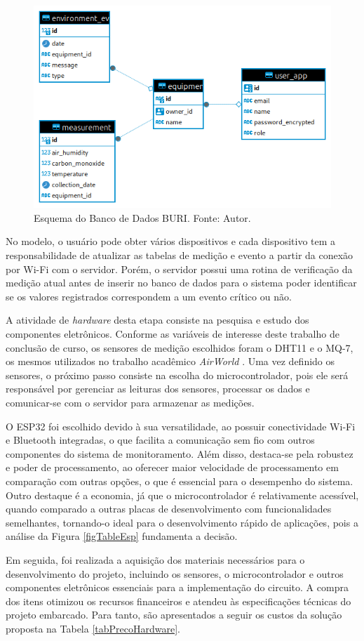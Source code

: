 \begin{figure}[ht]
    \centering
    \includegraphics[width=.54\textwidth]{img/buri_schema_bd.png}
    \caption{Esquema do Banco de Dados BURI. Fonte: Autor.}\label{figSchemaBuriDB}
\end{figure}

No modelo, o usuário pode obter vários dispositivos e cada dispositivo tem a responsabilidade de atualizar as tabelas de medição e evento 
a partir da conexão por Wi-Fi com o servidor. Porém, o servidor possui uma rotina de verificação da medição atual antes de inserir no banco de dados 
para o sistema poder identificar se os valores registrados correspondem a um evento crítico ou não. 

A atividade de \textit{hardware} desta etapa consiste na pesquisa e estudo dos componentes eletrônicos. Conforme as variáveis de interesse deste trabalho de 
conclusão de curso, os sensores de medição escolhidos foram o DHT11 e o MQ-7, os mesmos utilizados no trabalho acadêmico \textit{AirWorld} \cite{UFAMAirWorld}. Uma vez definido os sensores, 
o próximo passo consiste na escolha do microcontrolador, pois ele será responsável por gerenciar as leituras dos sensores, processar os dados e comunicar-se com o servidor para armazenar as medições.

O ESP32 foi escolhido devido à sua versatilidade, ao possuir conectividade Wi-Fi e Bluetooth integradas, o que facilita a comunicação sem fio com outros componentes do sistema de monitoramento. Além disso, destaca-se 
pela robustez e poder de processamento, ao oferecer maior velocidade de processamento em comparação com outras opções, o que é essencial para o desempenho do sistema. Outro destaque é a economia, já que o microcontrolador 
é relativamente acessível, quando comparado a outras placas de desenvolvimento com funcionalidades semelhantes, tornando-o ideal para o desenvolvimento rápido de aplicações, pois a análise da Figura \ref{figTableEsp} fundamenta a decisão.

Em seguida, foi realizada a aquisição dos materiais necessários para o desenvolvimento do projeto, incluindo os sensores, o microcontrolador e outros componentes eletrônicos essenciais para a implementação do circuito. A compra dos itens 
otimizou os recursos financeiros e atendeu às especificações técnicas do projeto embarcado. Para tanto, são apresentados a seguir os custos da solução proposta na Tabela \ref{tabPrecoHardware}.

